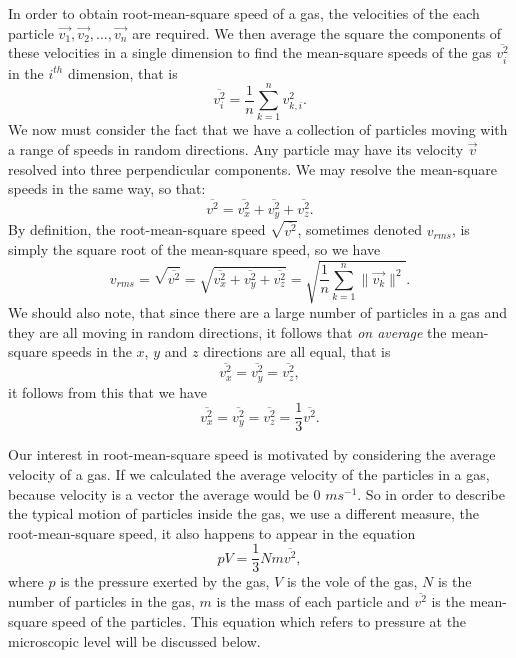 In order to obtain root-mean-square speed of a gas, the velocities of the each particle $\vec{v_1}, \vec{v_2}, \ldots, \vec{v_n}$ are required. We then average the square the components of these velocities in a single dimension to find the mean-square speeds of the gas $\overline{v_{i}^2}$ in the $i^{th}$ dimension, that is
\begin{equation}
    \overline{v_{i}^2} = \frac{1}{n} \sum_{k=1}^n v_{k, i}^2.
\end{equation}
We now must consider the fact that we have a collection of particles moving with a range of speeds in random directions. Any particle may have its velocity $\vec{v}$ resolved into three perpendicular components. We may resolve the mean-square speeds in the same way, so that:
\begin{equation*}
    \overline{v^2} = \overline{v_x^2} + \overline{v_y^2} + \overline{v_z^2}.
\end{equation*}
By definition, the root-mean-square speed $\sqrt{\overline{v^2}}$, sometimes denoted $v_{rms}$, is simply the square root of the mean-square speed, so we have
\begin{equation}
    v_{rms} = \sqrt{\overline{v^2}} = \sqrt{\overline{v_x^2} + \overline{v_y^2} + \overline{v_z^2}} = \sqrt{\frac{1}{n} \sum_{k=1}^n \| \vec{v_k} \|^2}.
\end{equation}
We should also note, that since there are a large number of particles in a gas and they are all moving in random directions, it follows that \textit{on average} the mean-square speeds in the $x$, $y$ and $z$ directions are all equal, that is
\begin{equation*}
    \overline{v_x^2} = \overline{v_y^2} = \overline{v_z^2},
\end{equation*}
it follows from this that we have
\begin{equation*}
    \overline{v_x^2} = \overline{v_y^2} = \overline{v_z^2} = \frac{1}{3} \overline{v^2}.
\end{equation*}

Our interest in root-mean-square speed is motivated by considering the average velocity of a gas. If we calculated the average velocity of the particles in a gas, because velocity is a vector the average would be $0$ $ms^{-1}$. So in order to describe the typical motion of particles inside the gas, we use a different measure, the root-mean-square speed, it also happens to appear in the equation
\begin{equation}
    pV = \frac{1}{3}Nm\overline{v^2},
\end{equation}
where $p$ is the pressure exerted by the gas, $V$ is the vole of the gas, $N$ is the number of particles in the gas, $m$ is the mass of each particle and $\overline{v^2}$ is the mean-square speed of the particles. This equation which refers to pressure at the microscopic level will be discussed below. 

